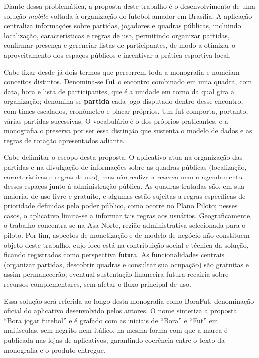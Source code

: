   Diante dessa problemática, a proposta deste trabalho é o desenvolvimento de uma solução \textit{mobile} voltada à organização do futebol amador em Brasília. A aplicação centraliza informações sobre partidas, jogadores e quadras públicas, incluindo localização, características e regras de uso, permitindo organizar partidas, confirmar presença e gerenciar listas de participantes, de modo a otimizar o aproveitamento dos espaços públicos e incentivar a prática esportiva local.

  Cabe fixar desde já dois termos que percorrem toda a monografia e nomeiam conceitos distintos. Denomina-se \textbf{fut} o encontro combinado em uma quadra, com data, hora e lista de participantes, que é a unidade em torno da qual gira a organização; denomina-se \textbf{partida} cada jogo disputado dentro desse encontro, com times escalados, cronômetro e placar próprios. Um fut comporta, portanto, várias partidas sucessivas. O vocabulário é o dos próprios praticantes, e a monografia o preserva por ser essa distinção que sustenta o modelo de dados e as regras de rotação apresentados adiante.

  Cabe delimitar o escopo desta proposta. O aplicativo atua na organização das partidas e na divulgação de informações sobre as quadras públicas (localização, características e regras de uso), mas não realiza a reserva nem o agendamento desses espaços junto à administração pública. As quadras tratadas são, em sua maioria, de uso livre e gratuito, e algumas estão sujeitas a regras específicas de prioridade definidas pelo poder público, como ocorre no Plano Piloto; nesses casos, o aplicativo limita-se a informar tais regras aos usuários. Geograficamente, o trabalho concentra-se na Asa Norte, região administrativa selecionada para o piloto. Por fim, aspectos de monetização e de modelo de negócio não constituem objeto deste trabalho, cujo foco está na contribuição social e técnica da solução, ficando registrados como perspectiva futura. As funcionalidades centrais (organizar partidas, descobrir quadras e consultar sua ocupação) são gratuitas e assim permanecerão; eventual sustentação financeira futura recairia sobre recursos complementares, sem afetar o fluxo principal de uso.

  Essa solução será referida ao longo desta monografia como BoraFut, denominação oficial do aplicativo desenvolvido pelos autores. O nome sintetiza a proposta “Bora jogar futebol” e é grafado com as iniciais de ``Bora'' e ``Fut'' em maiúsculas, sem negrito nem itálico, na mesma forma com que a marca é publicada nas lojas de aplicativos, garantindo coerência entre o texto da monografia e o produto entregue.

